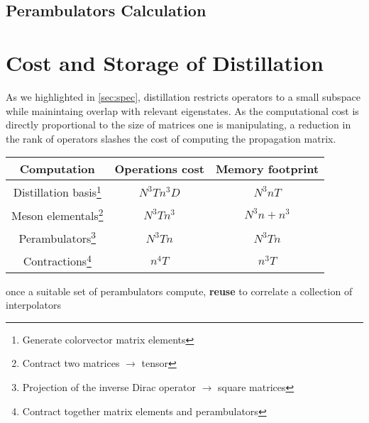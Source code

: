 \subsection{Perambulators Calculation}

\section{Cost and Storage of Distillation}
As we highlighted in \ref{sec:spec}, distillation restricts operators to a small subspace while mainintaing overlap with relevant eigenstates. As the computational cost is directly proportional to the size of matrices one is manipulating, a reduction in the rank of operators slashes the cost of computing the propagation matrix. 
      \vspace{1em}
       
         \begin{minipage}{16cm}
        \hspace*{2em}\begin{tabular}{ccc}
        Computation    & Operations cost & Memory footprint \\ \hline
        Distillation basis\footnote{Generate colorvector matrix elements}& $N^3Tn^3D$         & $N^3nT$      \\
        Meson elementals\footnote{Contract two matrices $\to$ tensor} & $N^3Tn^3$      & $N^3n + n^3$  \\
        Perambulators\footnote{Projection of the inverse Dirac operator $\to$ square matrices} & $N^3Tn$   & $N^3Tn$            \\
        Contractions\footnote{Contract together matrix elements and perambulators}   & $n^4T$    & $n^{3}T$   
        \end{tabular}
        \end{minipage}
        once a suitable set of perambulators compute, \textbf{reuse} to correlate a collection of interpolators
        
